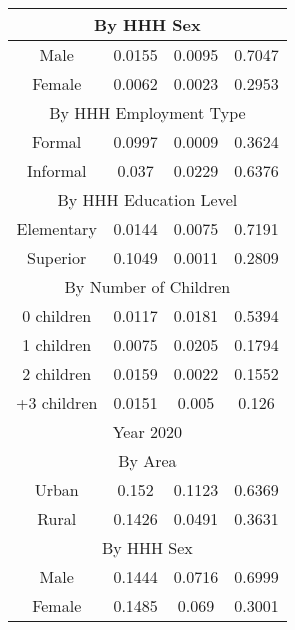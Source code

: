 \begin{table}[]
\begin{tabular}{@{}cccc@{}}
\multicolumn{4}{c}{By HHH Sex}                                              \\ \midrule
Male        & 0.0155                  & 0.0095           & 0.7047           \\
Female      & 0.0062                  & 0.0023           & 0.2953           \\ \midrule
\multicolumn{4}{c}{By HHH Employment Type}                                  \\ \midrule
Formal      & 0.0997                  & 0.0009           & 0.3624           \\
Informal    & 0.037                   & 0.0229           & 0.6376           \\ \midrule
\multicolumn{4}{c}{By HHH Education Level}                                  \\ \midrule
Elementary  & 0.0144                  & 0.0075           & 0.7191           \\
Superior    & 0.1049                  & 0.0011           & 0.2809           \\ \midrule
\multicolumn{4}{c}{By Number of Children}                                   \\ \midrule
0 children  & 0.0117                  & 0.0181           & 0.5394           \\
1 children  & 0.0075                  & 0.0205           & 0.1794           \\
2 children  & 0.0159                  & 0.0022           & 0.1552           \\
+3 children & 0.0151                  & 0.005            & 0.126            \\ \midrule
\multicolumn{4}{c}{Year 2020}                                               \\ \midrule
\multicolumn{4}{c}{By Area}                                                 \\ \midrule
Urban       & 0.152                   & 0.1123           & 0.6369           \\
Rural       & 0.1426                  & 0.0491           & 0.3631           \\ \midrule
\multicolumn{4}{c}{By HHH Sex}                                              \\ \midrule
Male        & 0.1444                  & 0.0716           & 0.6999           \\
Female      & 0.1485                  & 0.069            & 0.3001           \\ \midrule

\end{tabular}
\end{table}
